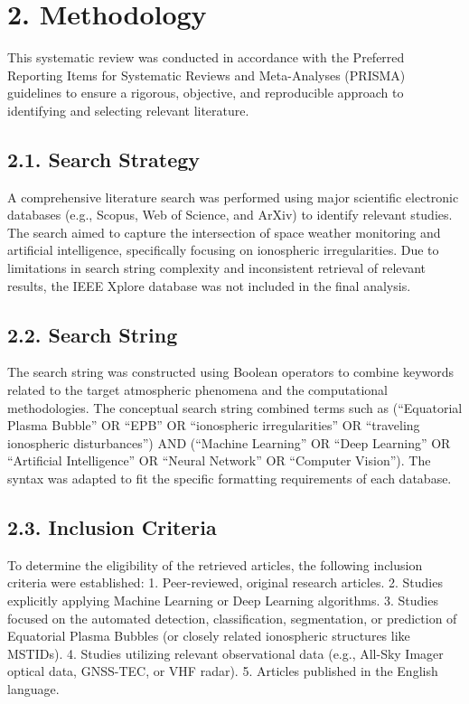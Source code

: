 \hypertarget{methodology}{%
\section{2. Methodology}\label{methodology}}

This systematic review was conducted in accordance with the Preferred
Reporting Items for Systematic Reviews and Meta-Analyses (PRISMA)
guidelines to ensure a rigorous, objective, and reproducible approach to
identifying and selecting relevant literature.

\hypertarget{search-strategy}{%
\subsection{2.1. Search Strategy}\label{search-strategy}}

A comprehensive literature search was performed using major scientific
electronic databases (e.g., Scopus, Web of Science, and ArXiv) to
identify relevant studies. The search aimed to capture the intersection
of space weather monitoring and artificial intelligence, specifically
focusing on ionospheric irregularities. Due to limitations in search
string complexity and inconsistent retrieval of relevant results, the
IEEE Xplore database was not included in the final analysis.

\hypertarget{search-string}{%
\subsection{2.2. Search String}\label{search-string}}

The search string was constructed using Boolean operators to combine
keywords related to the target atmospheric phenomena and the
computational methodologies. The conceptual search string combined terms
such as (``Equatorial Plasma Bubble'' OR ``EPB'' OR ``ionospheric
irregularities'' OR ``traveling ionospheric disturbances'') AND
(``Machine Learning'' OR ``Deep Learning'' OR ``Artificial
Intelligence'' OR ``Neural Network'' OR ``Computer Vision''). The syntax
was adapted to fit the specific formatting requirements of each
database.

\hypertarget{inclusion-criteria}{%
\subsection{2.3. Inclusion Criteria}\label{inclusion-criteria}}

To determine the eligibility of the retrieved articles, the following
inclusion criteria were established: 1. Peer-reviewed, original research
articles. 2. Studies explicitly applying Machine Learning or Deep
Learning algorithms. 3. Studies focused on the automated detection,
classification, segmentation, or prediction of Equatorial Plasma Bubbles
(or closely related ionospheric structures like MSTIDs). 4. Studies
utilizing relevant observational data (e.g., All-Sky Imager optical
data, GNSS-TEC, or VHF radar). 5. Articles published in the English
language.

